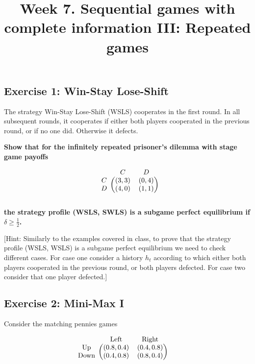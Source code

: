 \documentclass[10pt]{article}
\title{\textbf{Week 7.} Sequential games with complete information III: Repeated games}
\date{}
\begin{document}
\maketitle

\subsection*{Exercise 1: Win-Stay Lose-Shift}

The strategy Win-Stay Lose-Shift (WSLS) cooperates in the first round. In all
subsequent rounds, it cooperates if either both players cooperated in the
previous round, or if no one did. Otherwise it defects.

\textbf{Show that for the infinitely repeated prisoner's dilemma with stage game
payoffs}

\begin{equation*}
    \begin{blockarray}{ccc}
        & C & D \\
        \begin{block}{c(cc)}
            C & (3, 3) & (0, 4) \\
            D & (4, 0) & (1, 1) \\
        \end{block}
    \end{blockarray}
\end{equation*}

\textbf{the strategy profile (WSLS, SWLS) is a subgame perfect equilibrium if
\(\delta \geq \frac{1}{2}\).}

[Hint: Similarly to the examples covered in class, to prove that the strategy
profile (WSLS, WSLS) is a subgame perfect equilibrium we need to check different
cases. For case one consider a history \(h_t\) according to which either both
players cooperated in the previous round, or both players defected. For case two
consider that one player defected.]

\subsection*{Exercise 2: Mini-Max I}

Consider the matching pennies games

\begin{equation*}
    \begin{blockarray}{ccc}
        & \text{Left} & \text{Right} \\
        \begin{block}{c(cc)}
            \text{Up} &    (0.8, 0.4) & (0.4, 0.8) \\
            \text{Down} & (0.4, 0.8) & (0.8, 0.4) \\
        \end{block}
    \end{blockarray}\qquad
    \end{equation*}
\end{document}
